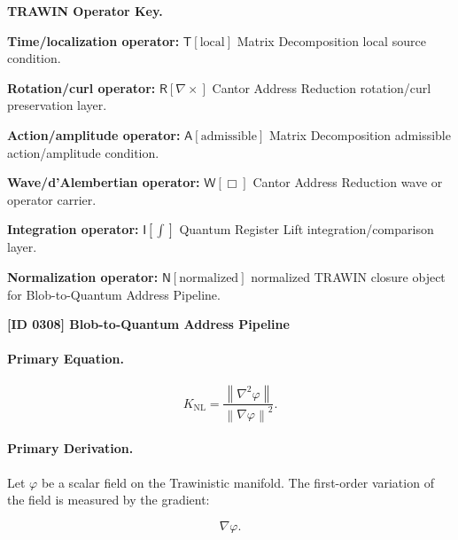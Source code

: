 \par\vspace{0.45\baselineskip}
\noindent\begin{minipage}[t]{\linewidth}
\begingroup
\small
\raggedright
\textbf{TRAWIN Operator Key.}\par
\noindent\textbf{Time/localization operator:} $\mathsf{T}\!\left[\mathrm{local}\right]$ Matrix Decomposition local source condition.\par
\noindent\textbf{Rotation/curl operator:} $\mathsf{R}\!\left[\nabla\times\right]$ Cantor Address Reduction rotation/curl preservation layer.\par
\noindent\textbf{Action/amplitude operator:} $\mathsf{A}\!\left[\mathrm{admissible}\right]$ Matrix Decomposition admissible action/amplitude condition.\par
\noindent\textbf{Wave/d'Alembertian operator:} $\mathsf{W}\!\left[\Box\right]$ Cantor Address Reduction wave or operator carrier.\par
\noindent\textbf{Integration operator:} $\mathsf{I}\!\left[\int\right]$ Quantum Register Lift integration/comparison layer.\par
\noindent\textbf{Normalization operator:} $\mathsf{N}\!\left[\mathrm{normalized}\right]$ normalized TRAWIN closure object for Blob-to-Quantum Address Pipeline.\par
\endgroup
\end{minipage}

\clearpage
\noindent\textbf{[ID 0308] Blob-to-Quantum Address Pipeline}\par
\vspace{0.35em}
\paragraph{Primary Equation.}
\begin{equation}
K_{\mathrm{NL}}
=
\frac{\left\lVert \nabla^{2}\varphi\right\rVert}
{\left\lVert \nabla\varphi\right\rVert^{2}} .
\end{equation}

\paragraph{Primary Derivation.}
Let $\varphi$ be a scalar field on the Trawinistic manifold.  
The first-order variation of the field is measured by the gradient:

\begin{equation}
\nabla\varphi .
\end{equation}

